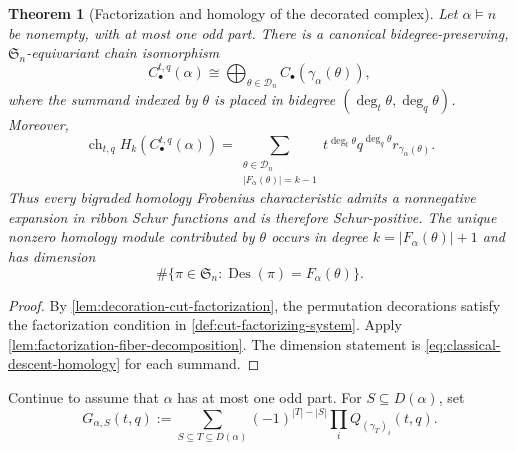 \documentclass{amsart}
\newtheorem{theorem}{Theorem}[section]
\theoremstyle{definition}
\theoremstyle{remark}
\newcommand{\Des}{\operatorname{Des}}
\begin{document}
\begin{theorem}[Factorization and homology of the decorated complex]
\label{thm:total-decoration-ribbon-homology}
Let $\alpha\models n$ be nonempty, with at most one odd part.  There is a
canonical bidegree-preserving, $\mathfrak S_n$-equivariant chain isomorphism
\begin{equation*}
 C_\bullet^{t,q}(\alpha)
 \cong
 \bigoplus_{\theta\in\mathcal D_n}
 C_\bullet(\gamma_\alpha(\theta)),
\end{equation*}
where the summand indexed by $\theta$ is placed in bidegree
$(\deg_t\theta,\deg_q\theta)$.  Moreover,
\begin{equation}
 \operatorname{ch}_{t,q}H_k(C_\bullet^{t,q}(\alpha))
 =\sum_{\substack{\theta\in\mathcal D_n\\
                   |F_\alpha(\theta)|=k-1}}
   t^{\deg_t\theta}q^{\deg_q\theta}
   r_{\gamma_\alpha(\theta)}.
 \label{eq:total-decoration-homology-character}
\end{equation}
Thus every bigraded homology Frobenius characteristic admits a nonnegative
expansion in ribbon Schur functions and is therefore Schur-positive.  The
unique nonzero homology module contributed by $\theta$ occurs in degree
$k=|F_\alpha(\theta)|+1$ and has dimension
\begin{equation*}
 \#\{\pi\in\mathfrak S_n:\Des(\pi)=F_\alpha(\theta)\}.
\end{equation*}
\end{theorem}

\begin{proof}
By \cref{lem:decoration-cut-factorization}, the permutation decorations
satisfy the factorization condition in
\cref{def:cut-factorizing-system}.  Apply
\cref{lem:factorization-fiber-decomposition}.  The dimension statement is
\eqref{eq:classical-descent-homology} for each summand.
\end{proof}

Continue to assume that $\alpha$ has at most one odd part.  For
$S\subseteq D(\alpha)$, set
\begin{equation}
 G_{\alpha,S}(t,q):=
 \sum_{S\subseteq T\subseteq D(\alpha)}
 (-1)^{|T|-|S|}\prod_iQ_{(\gamma_T)_i}(t,q).
 \label{eq:exact-cut-polynomial}
\end{equation}
\end{document}

